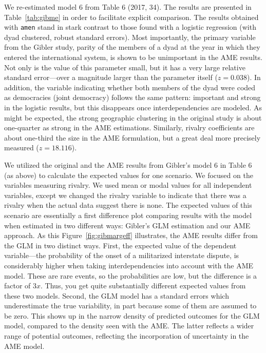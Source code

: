 We re-estimated model 6 from Table 6 (2017, 34). The results are presented in Table~\ref{tab:gibme} in order to facilitate explicit comparison.
The results obtained with \texttt{amen} stand in stark contrast to those found with a logistic regression (with dyad clustered, robust standard errors).  Most importantly, the primary variable from the Gibler study, parity of the members of a dyad at the year in which they entered the international system, is shown to be unimportant in the AME results.  Not only is the value of this parameter small, but it has a very large relative standard error---over a magnitude larger than the parameter itself ($z= 0.038$). In addition, the variable indicating whether both members of the dyad were coded as democracies (joint democracy) follows the same pattern: important and strong in the logistic results, but this disappears once interdependencies are modeled.  As might be expected, the strong geographic clustering in the original study is about one-quarter as strong in the AME estimations. Similarly, rivalry coefficients are about one-third the size in the AME formulation, but a great deal more precisely measured ($z=18.116$). 

We utilized the original and the AME results from Gibler's model 6 in Table 6 (as above) to calculate the expected values for one scenario. We focused on the variables measuring rivalry.  We used mean or modal values for all independent variables, except we changed the rivalry variable to indicate that there was a rivalry when the actual data suggest there is none.  The expected values of this scenario are essentially a first difference plot comparing results with the model when estimated in two different ways: Gibler's GLM estimation and our AME approach.  As this Figure~\ref{fig:gibmargeff} illustrates, the AME results differ from the GLM in two distinct ways. First, the expected value of the dependent variable---the probability of the onset of a militarized interstate dispute, is considerably higher when taking interdependencies into account with the AME model.  These are rare events, so the probabilities are low, but the difference is a factor of $3x$. Thus, you get quite substantially different expected values from these two models.  Second, the GLM model has a standard errors which underestimate the true variability, in part because some of them are assumed to be zero.  This shows up in the narrow density of predicted outcomes for the GLM model, compared to the density seen with the AME. The latter reflects a wider range of potential outcomes, reflecting the incorporation of uncertainty in the AME model.

